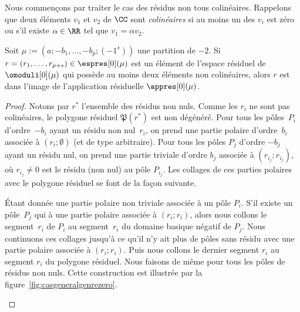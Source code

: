Nous commençons par traiter le cas des résidus non tous colinéaires. Rappelons que deux éléments $v_{1}$ et $v_{2}$ de $\CC$ sont \emph{colinéaires} si au moins un des $v_{i}$ est zéro ou s'il existe $\alpha\in \RR$ tel que $v_{1} = \alpha v_{2}$.
\begin{lem}\label{lem:gzerogen1}
Soit $\mu:=(a;-b_{1},\dots,-b_{p};(-1^{s}))$ une partition de $-2$. Si $r=(r_{1}, \dots , r_{p+s})\in\espres[0](\mu)$ est un élément de l'espace résiduel de $\omoduli[0](\mu)$ qui possède au moins deux éléments non colinéaires, alors $r$ est dans l’image de l'application résiduelle $\appres[0](\mu)$.
\end{lem}

\begin{proof}
Notons par $r^{\ast}$ l'ensemble des résidus non nuls.
Comme les $r_{i}$ ne sont pas colinéaires, le polygone résiduel $\mathfrak{P}(r^{\ast})$ est non dégénéré. Pour tous les pôles~$P_{i}$ d'ordre~$-b_{i}$ ayant un résidu non nul~$r_{i}$, on prend une partie polaire d'ordre~$b_{i}$ associée à $(r_{i};\emptyset)$ (et de type arbitraire). Pour tous les pôles $P_{j}$ d'ordre $-b_{j}$ ayant un résidu nul, on prend une partie triviale d'ordre $b_{j}$ associée à $(r_{i_{j}};r_{i_{j}})$, où $r_{i_{j}}\neq0$ est le résidu (non nul) au pôle $P_{i_{j}}$. Les collages de ces parties polaires avec le polygone résiduel se font de la façon suivante.

Étant donnée une partie polaire non triviale associée à un pôle $P_{i}$. S'il existe un pôle~$P_{j}$ qui à une partie polaire associée à $(r_{i};r_{i})$, alors nous collons le segment~$r_{i}$ de $P_{i}$ au segment~$r_{i}$ du domaine basique négatif de $P_{j}$. Nous continuons ces collages jusqu'à ce qu'il n'y ait plus de pôles sans résidu avec une partie polaire associée à $(r_{i};r_{i})$. Puis nous collons le dernier segment $r_{i}$ au segment $r_{i}$ du polygone résiduel. Nous faisons de même pour tous les pôles de résidus non nuls. Cette construction est illustrée par la figure~\ref{fig:casgeneralgenrezero}.

\begin{figure}[htb]
\center
{}
\end{figure}
\end{proof}
